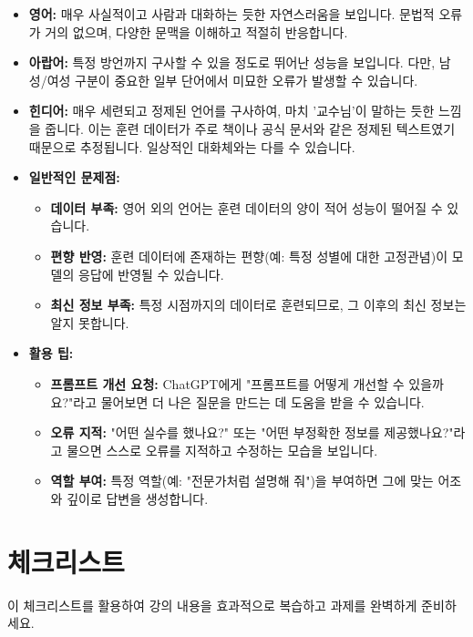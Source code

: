 \documentclass[11pt,a4paper]{article}
\begin{document}
\begin{tcolorbox}[examplebox, title=NLTK 스테밍 코드 예시]
\begin{itemize}
    \item \textbf{영어:} 매우 사실적이고 사람과 대화하는 듯한 자연스러움을 보입니다. 문법적 오류가 거의 없으며, 다양한 문맥을 이해하고 적절히 반응합니다.
    \item \textbf{아랍어:} 특정 방언까지 구사할 수 있을 정도로 뛰어난 성능을 보입니다. 다만, 남성/여성 구분이 중요한 일부 단어에서 미묘한 오류가 발생할 수 있습니다.
    \item \textbf{힌디어:} 매우 세련되고 정제된 언어를 구사하여, 마치 '교수님'이 말하는 듯한 느낌을 줍니다. 이는 훈련 데이터가 주로 책이나 공식 문서와 같은 정제된 텍스트였기 때문으로 추정됩니다. 일상적인 대화체와는 다를 수 있습니다.
    \item \textbf{일반적인 문제점:}
        \begin{itemize}
            \item \textbf{데이터 부족:} 영어 외의 언어는 훈련 데이터의 양이 적어 성능이 떨어질 수 있습니다.
            \item \textbf{편향 반영:} 훈련 데이터에 존재하는 편향(예: 특정 성별에 대한 고정관념)이 모델의 응답에 반영될 수 있습니다.
            \item \textbf{최신 정보 부족:} 특정 시점까지의 데이터로 훈련되므로, 그 이후의 최신 정보는 알지 못합니다.
        \end{itemize}
    \item \textbf{활용 팁:}
        \begin{itemize}
            \item \textbf{프롬프트 개선 요청:} ChatGPT에게 "프롬프트를 어떻게 개선할 수 있을까요?"라고 물어보면 더 나은 질문을 만드는 데 도움을 받을 수 있습니다.
            \item \textbf{오류 지적:} "어떤 실수를 했나요?" 또는 "어떤 부정확한 정보를 제공했나요?"라고 물으면 스스로 오류를 지적하고 수정하는 모습을 보입니다.
            \item \textbf{역할 부여:} 특정 역할(예: "전문가처럼 설명해 줘")을 부여하면 그에 맞는 어조와 깊이로 답변을 생성합니다.
        \end{itemize}
\end{itemize}

\newpage
\section*{체크리스트}

\begin{tcolorbox}[summarybox, title=학습 및 과제 점검 체크리스트]
이 체크리스트를 활용하여 강의 내용을 효과적으로 복습하고 과제를 완벽하게 준비하세요.
\end{tcolorbox}


\end{tcolorbox}
\end{document}
